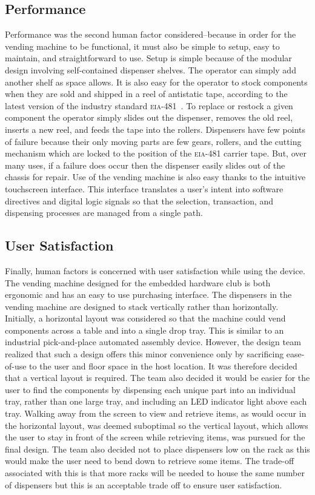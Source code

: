 \documentclass[12pt,draft,oneside]{article}
\begin{document}
\subsection{Performance}
Performance was the second human factor considered--because in order for the vending machine to be functional, it must also be simple to setup, easy to maintain, and straightforward to use. Setup is simple because of the modular design involving self-contained dispenser shelves. The operator can simply add another shelf as space allows. It is also easy for the operator to stock components when they are sold and shipped in a reel of antistatic tape, according to the latest version of the industry standard \textsc{eia-481}~\cite{eia-481}. To replace or restock a given component the operator simply slides out the dispenser, removes the old reel, inserts a new reel, and feeds the tape into the rollers. Dispensers have few points of failure because their only moving parts are few gears, rollers, and the cutting mechanism which are locked to the position of the \textsc{eia-481} carrier tape. But, over many uses, if a failure does occur then the dispenser easily slides out of the chassis for repair. Use of the vending machine is also easy thanks to the intuitive touchscreen interface. This interface translates a user's intent into software directives and digital logic signals so that the selection, transaction, and dispensing processes are managed from a single path.

\subsection{User Satisfaction}
Finally, human factors is concerned with user satisfaction while using the device. The vending machine designed for the embedded hardware club is both ergonomic and has an easy to use purchasing interface. The dispensers in the vending machine are designed to stack vertically rather than horizontally. Initially, a horizontal layout was considered so that the machine could vend components across a table and into a single drop tray. This is similar to an industrial pick-and-place automated assembly device. However, the design team realized that such a design offers this minor convenience only by sacrificing ease-of-use to the user and floor space in the host location. It was therefore decided that a vertical layout is required. The team also decided it would be easier for the user to find the components by dispensing each unique part into an individual tray, rather than one large tray, and including an LED indicator light above each tray. Walking away from the screen to view and retrieve items, as would occur in the horizontal layout, was deemed suboptimal so the vertical layout, which allows the user to stay in front of the screen while retrieving items, was pursued for the final design. The team also decided not to place dispensers low on the rack as this would make the user need to bend down to retrieve some items. The trade-off associated with this is that more racks will be needed to house the same number of dispensers but this is an acceptable trade off to ensure user satisfaction.
\end{document}

